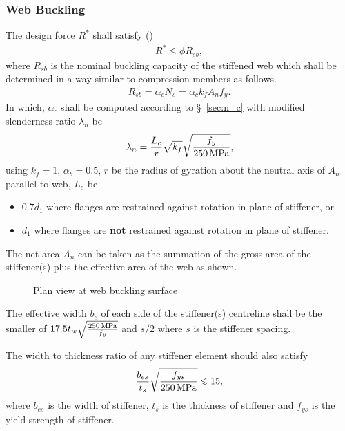 \subsubsection{Web Buckling}
The design force $R^*$ shall satisfy ()
\begin{gather}
R^*\leqslant\phi{}R_{sb},
\end{gather}
where $R_{sb}$ is the nominal buckling capacity of the stiffened web which shall be determined in a way similar to compression members as follows.
\begin{gather}
R_{sb}=\alpha_cN_s=\alpha_ck_fA_nf_y.
\end{gather}
In which, $\alpha_c$ shall be computed according to \S~\ref{sec:n_c} with modified slenderness ratio $\lambda_n$ be
\begin{gather}
\lambda_n=\dfrac{L_e}{r}\sqrt{k_f}\sqrt{\dfrac{f_y}{\SI{250}{\mega\pascal}}},
\end{gather}
using $k_f=1$, $\alpha_b=0.5$, $r$ be the radius of gyration about the neutral axis of $A_n$ parallel to web, $L_e$ be
\begin{itemize}
\item $0.7d_1$ where flanges are restrained against rotation in plane of stiffener, or
\item $d_1$ where flanges are \textbf{not} restrained against rotation in plane of stiffener.
\end{itemize}
The net area $A_n$ can be taken as the summation of the gross area of the stiffener(s) plus the effective area of the web as shown.
\begin{figure}[H]
\centering
\caption{Plan view at web buckling surface}
\end{figure}

The effective width $b_e$ of each side of the stiffener(s) centreline shall be the smaller of $17.5t_w\sqrt{\frac{\SI{250}{\mega\pascal}}{f_y}}$ and $s/2$ where $s$ is the stiffener spacing.

The width to thickness ratio of any stiffener element should also satisfy
\begin{gather}
\dfrac{b_{es}}{t_s}\sqrt{\dfrac{f_{ys}}{\SI{250}{\mega\pascal}}}\leqslant15,
\end{gather}
where $b_{es}$ is the width of stiffener, $t_s$ is the thickness of stiffener and $f_{ys}$ is the yield strength of stiffener.


